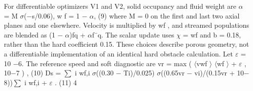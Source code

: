 \documentclass[11pt]{article}
\begin{document}
For differentiable optimizers V1 and V2, solid occupancy and fluid weight are
\ensuremath{\alpha} = M \ensuremath{\sigma}(\ensuremath{-}s/0.06), w f = 1 \ensuremath{-} \ensuremath{\alpha}, (9)
where M = 0 on the first and last two axial planes and one elsewhere. Velocity is multiplied by
wf , and streamed populations are blended as (1 \ensuremath{-} \ensuremath{\alpha})fq + \ensuremath{\alpha}f¯q. The scalar update uses \ensuremath{\chi} = wf
and b = 0.18, rather than the hard coefficient 0.15. These choices describe porous geometry, not a
differentiable implementation of an identical hard obstacle calculation.
Let \ensuremath{\varepsilon} = 10 \ensuremath{-}6. The reference speed and soft diagnostic are
vr = max
( \ensuremath{\langle}vwf \ensuremath{\rangle}
\ensuremath{\langle}wf \ensuremath{\rangle} + \ensuremath{\varepsilon} , 10\ensuremath{-}7
)
, (10)
Ds =
\ensuremath{\sum}
i wf,i \ensuremath{\sigma}((0.30 \ensuremath{-} Ti)/0.025) \ensuremath{\sigma}((0.65vr \ensuremath{-} vi)/(0.15vr + 10\ensuremath{-}8))\ensuremath{\sum}
i wf,i + \ensuremath{\varepsilon} . (11)
4
\end{document}
